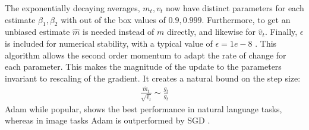 The exponentially decaying averages, $m_t, v_t$ now have distinct parameters for each estimate $\beta_1, \beta_2$ with out of the box values of $0.9, 0.999$. Furthermore, to get an unbiased estimate $\hat{m}$ is needed instead of $m$ directly, and likewise for $\hat{v}_t$. Finally, $\epsilon$ is included for numerical stability, with a typical value of $\epsilon=1e-8$ \cite{kingmaAdamMethodStochastic2017}.
This algorithm allows the second order momentum to adapt the rate of change for each parameter. This makes the magnitude of the update to the parameters invariant to rescaling of the gradient. It creates a natural bound on the step size:
\begin{align}
	\frac{\hat{m}_t}{\sqrt{\hat{v}_t}} \sim \frac{g_t}{g_t}
\end{align}
\ac{Adam} while popular, shows the best performance in natural language tasks, whereas in image tasks \ac{Adam} is outperformed by \ac{SGD} \cite{wilsonMarginalValueAdaptive2017}.

